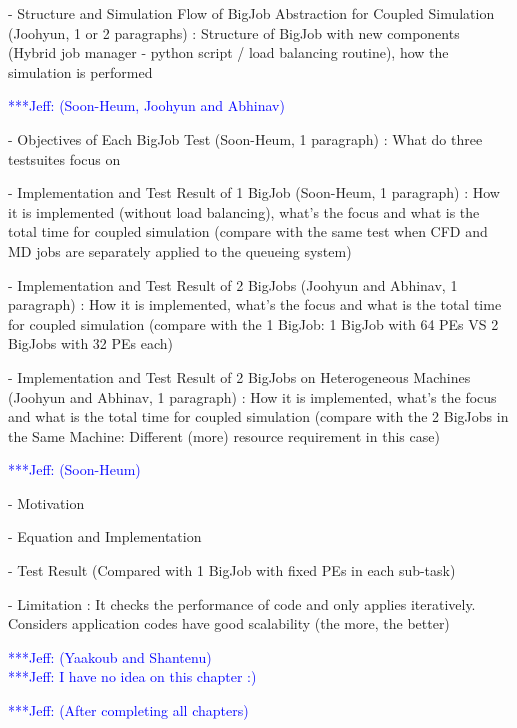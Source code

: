 \documentclass[times, 10pt,twocolumn]{article}
\newcommand{\skonote}[1]{ {\textcolor{blue} { ***Jeff: #1 }}}
\newcommand{\skonote}[1]{}
\begin{document}
- Structure and Simulation Flow of BigJob Abstraction for Coupled Simulation (Joohyun, 1 or 2 paragraphs)
: Structure of BigJob with new components (Hybrid job manager - python script / load balancing routine), how the simulation is performed


\skonote{(Soon-Heum, Joohyun and Abhinav)}

- Objectives of Each BigJob Test (Soon-Heum, 1 paragraph)
: What do three testsuites focus on

- Implementation and Test Result of 1 BigJob (Soon-Heum, 1 paragraph)
: How it is implemented (without load balancing), what's the focus and what is the total time for coupled simulation (compare with the same test when CFD and MD jobs are separately applied to the queueing system)

- Implementation and Test Result of 2 BigJobs (Joohyun and Abhinav, 1 paragraph)
: How it is implemented, what's the focus and what is the total time for coupled simulation (compare with the 1 BigJob: 1 BigJob with 64 PEs VS 2 BigJobs with 32 PEs each)

- Implementation and Test Result of 2 BigJobs on Heterogeneous Machines (Joohyun and Abhinav, 1 paragraph)
: How it is implemented, what's the focus and what is the total time for coupled simulation (compare with the 2 BigJobs in the Same Machine: Different (more) resource requirement in this case) 


\skonote{(Soon-Heum)}

- Motivation

- Equation and Implementation

- Test Result (Compared with 1 BigJob with fixed PEs in each sub-task)

- Limitation
: It checks the performance of code and only applies iteratively. Considers application codes have good scalability (the more, the better)


\skonote{(Yaakoub and Shantenu)}\\
\skonote{I have no idea on this chapter :)}


\skonote{(After completing all chapters)}
\end{document}
